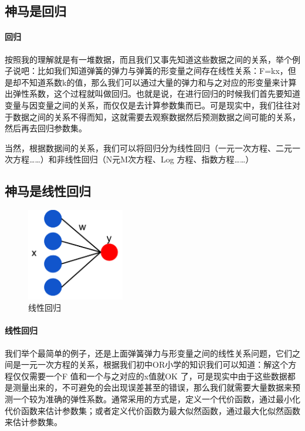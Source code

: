 \documentclass[a4paper, 11pt, hyperref, UTF8]{ctexart} %
\begin{document}
\subsection{神马是回归}
\paragraph{回归}按照我的理解就是有一堆数据，而且我们又事先知道这些数据之间的关系，举个例子说吧：比如我们知道弹簧的弹力与弹簧的形变量之间存在线性关系：F=kx，但是却不知道系数k的值，那么我们可以通过大量的弹力和与之对应的形变量来计算出弹性系数，这个过程就叫做回归。也就是说，在进行回归的时候我们首先要知道变量与因变量之间的关系，而仅仅是去计算参数集而已。可是现实中，我们往往对于数据之间的关系不得而知，这就需要去观察数据然后预测数据之间可能的关系，然后再去回归参数集。

当然，根据数据间的关系，我们可以将回归分为线性回归（一元一次方程、二元一次方程……）和非线性回归（N元M次方程、Log 方程、指数方程……）

\subsection{神马是线性回归}

\begin{figure}[H]
\centering
\includegraphics[width=0.38\textwidth,height=0.38\textwidth]{1.png}
\caption{线性回归}
\end{figure}
\paragraph{线性回归}我们举个最简单的例子，还是上面弹簧弹力与形变量之间的线性关系问题，它们之间是一元一次方程的关系，根据我们初中OR小学的知识我们可以知道：解这个方程仅仅需要一个F 值和一个与之对应的x值就OK 了，可是现实中由于这些数据都是测量出来的，不可避免的会出现误差甚至的错误，那么我们就需要大量数据来预测一个较为准确的弹性系数。通常采用的方式是，定义一个代价函数，通过最小化代价函数来估计参数集；或者定义代价函数为最大似然函数，通过最大化似然函数来估计参数集。
\end{document}
